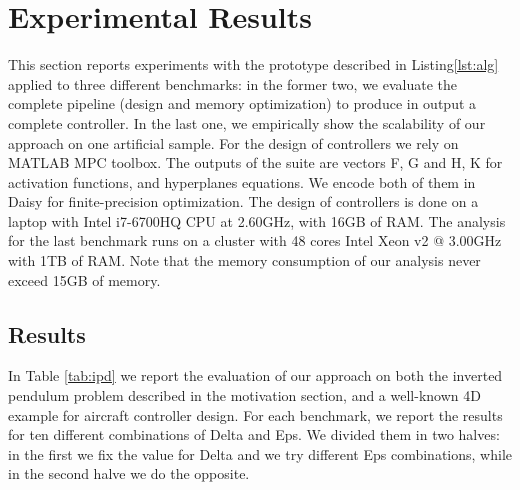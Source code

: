 \section{Experimental Results}

This section reports experiments with the prototype described in Listing\ref{lst:alg} applied to three different benchmarks: in the former two, we evaluate the complete pipeline (design and memory optimization) to produce in output a complete controller. In the last one, we empirically show the scalability of our approach on one artificial sample.
For the design of controllers we rely on MATLAB MPC toolbox. The outputs of the suite are vectors F, G and H, K for activation functions, and hyperplanes equations. We encode both of them in Daisy for finite-precision optimization.
The design of controllers is done on a laptop with Intel i7-6700HQ CPU at 2.60GHz, with 16GB of RAM. 
The analysis for the last benchmark runs on a cluster with 48 cores Intel Xeon v2 @ 3.00GHz with 1TB of RAM. Note that the memory consumption of our analysis never exceed 15GB of memory.

\subsection{Results}

In Table \ref{tab:ipd} we report the evaluation of our approach on both the inverted pendulum problem described in the motivation section, and a well-known 4D example for aircraft controller design. For each benchmark, we report the results for ten different combinations of Delta and Eps. We divided them in two halves: in the  first we fix the value for Delta and we try different Eps combinations, while in the second halve we do the opposite.

